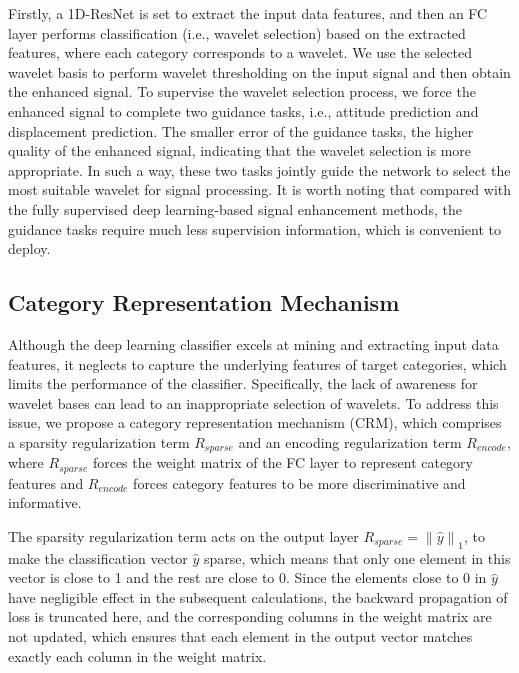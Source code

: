 \documentclass[letterpaper]{article} %
\begin{document}
	Firstly, a 1D-ResNet is set to extract the input data features, and then an FC layer performs classification (i.e., wavelet selection) based on the extracted features, where each category corresponds to a wavelet. We use the selected wavelet basis to perform wavelet thresholding on the input signal and then obtain the enhanced signal. To supervise the wavelet selection process, we force the enhanced signal to complete two guidance tasks, i.e., attitude prediction and displacement prediction. The smaller error of the guidance tasks, the higher quality of the enhanced signal, indicating that the wavelet selection is more appropriate. In such a way, these two tasks jointly guide the network to select the most suitable wavelet for signal processing. It is worth noting that compared with the fully supervised deep learning-based signal enhancement methods, the guidance tasks require much less supervision information, which is convenient to deploy.


	\subsection{Category Representation Mechanism}
	Although the deep learning classifier excels at mining and extracting input data features, it neglects to capture the underlying features of target categories, which limits the performance of the classifier. Specifically, the lack of awareness for wavelet bases can lead to an inappropriate selection of wavelets.
	To address this issue, we propose a category representation mechanism (CRM), which comprises a sparsity regularization term $R_{sparse}$ and an encoding regularization term $R_{encode}$, where $R_{sparse}$ forces the weight matrix of the FC layer to represent category features and $R_{encode}$ forces category features to be more discriminative and informative.

	The sparsity regularization term acts on the output layer ${R_{sparse}} = {\left\| {\hat y} \right\|_1}$, to make the classification vector $\hat{y}$ sparse, which means that only one element in this vector is close to 1 and the rest are close to 0.
	Since the elements close to 0 in $\hat{y}$ have negligible effect in the subsequent calculations, the backward propagation of loss is truncated here, and the corresponding columns in the weight matrix are not updated, which ensures that each element in the output vector matches exactly each column in the weight matrix.
\end{document}
